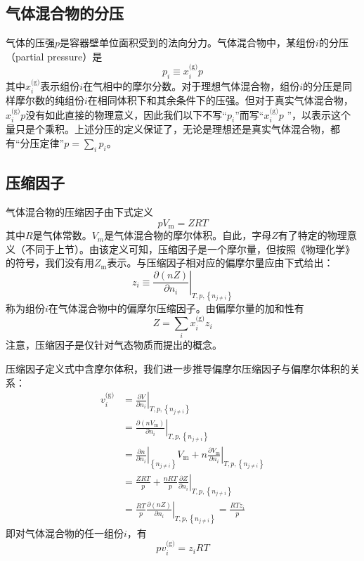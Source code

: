 \documentclass[main.tex]{subfiles}
\begin{document}
\subsection{气体混合物的分压}
气体的压强$p$是容器壁单位面积受到的法向分力。气体混合物中，某组份$i$的分压（partial pressure）是
\[p_i\equiv x_i^\text{(g)}p\]
其中$x_i^\text{(g)}$表示组份$i$在气相中的摩尔分数。对于理想气体混合物，组份$i$的分压是同样摩尔数的纯组份$i$在相同体积下和其余条件下的压强。但对于真实气体混合物，$x_i^\text{(g)}p$没有如此直接的物理意义，因此我们以下不写“$p_i$”而写“$x_i^\text{(g)}p$
”，以表示这个量只是个乘积。上述分压的定义保证了，无论是理想还是真实气体混合物，都有“分压定律”$p=\sum_i p_i$。

\subsection{压缩因子}
气体混合物的压缩因子由下式定义
\[pV_\text{m}=ZRT\]
其中$R$是气体常数。$V_m$是气体混合物的摩尔体积。自此，字母$Z$有了特定的物理意义（不同于上节）。由该定义可知，压缩因子是一个摩尔量，但按照《物理化学》的符号，我们没有用$Z_\text{m}$表示。与压缩因子相对应的偏摩尔量应由下式给出：
\[z_i\equiv\left.\frac{\partial\left(n Z\right)}{\partial n_i}\right|_{T,p,\left\{n_{j\neq i}\right\}}\]
称为组份$i$在气体混合物中的偏摩尔压缩因子。由偏摩尔量的加和性有
\[Z=\sum_i x_i^\text{(g)}z_i\]
注意，压缩因子是仅针对气态物质而提出的概念。

压缩因子定义式中含摩尔体积，我们进一步推导偏摩尔压缩因子与偏摩尔体积的关系：
\begin{align*}
v_i^\text{(g)}&=\left.\frac{\partial V}{\partial n_i}\right|_{T,p,\left\{n_{j\neq i}\right\}}\\
&=\left.\frac{\partial\left(n V_\text{m}\right)}{\partial n_i}\right|_{T,p,\left\{n_{j\neq i}\right\}}\\
&=\left.\frac{\partial n}{\partial n_i}\right|_{\left\{n_{j\neq i}\right\}}V_\text{m}+n\left.\frac{\partial V_\text{m}}{\partial n_i}\right|_{T,p,\left\{n_{j\neq i}\right\}}\\
&=\frac{ZRT}{p}+\frac{nRT}{p}\left.\frac{\partial Z}{\partial n_i}\right|_{T,p,\left\{n_{j\neq i}\right\}}\\
&=\frac{RT}{p}\left.\frac{\partial\left(nZ\right)}{\partial n_i}\right|_{T,p,\left\{n_{j\neq i}\right\}}=\frac{RTz_i}{p}
\end{align*}
即对气体混合物的任一组份$i$，有
\[p v_i^\text{(g)}=z_iRT\]
\end{document}
